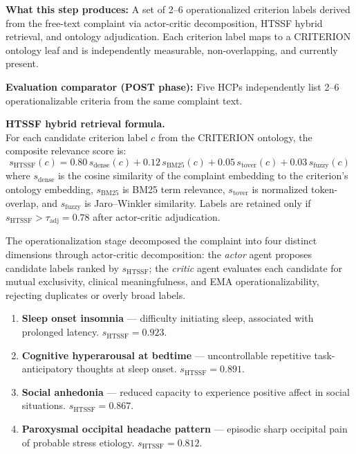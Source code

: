 \documentclass[11pt,a4paper]{article}
\begin{document}
\begin{tcolorbox}[
  colback=StepOneBG,colframe=PhoenixBlue,
  boxrule=0.6pt,arc=1.5mm,left=8pt,right=8pt
]
\small\textbf{What this step produces:} A set of 2--6 operationalized criterion labels derived from the free-text complaint via actor-critic decomposition, HTSSF hybrid retrieval, and ontology adjudication. Each criterion label maps to a CRITERION ontology leaf and is independently measurable, non-overlapping, and currently present.

\textbf{Evaluation comparator (POST phase):} Five HCPs independently list 2--6 operationalizable criteria from the same complaint text.
\end{tcolorbox}

\begin{tcolorbox}[colback=PhoenixSoft,colframe=PhoenixBlue!40,boxrule=0.5pt,arc=1.5mm,left=7pt,right=7pt,top=6pt,bottom=6pt]
\small\textbf{HTSSF hybrid retrieval formula.}\\[0.3em]
For each candidate criterion label $c$ from the CRITERION ontology, the composite relevance score is:
\[
  s_{\text{HTSSF}}(c) = 0.80\,s_{\text{dense}}(c)
                      + 0.12\,s_{\text{BM25}}(c)
                      + 0.05\,s_{\text{tover}}(c)
                      + 0.03\,s_{\text{fuzzy}}(c)
\]
where $s_{\text{dense}}$ is the cosine similarity of the complaint embedding to the criterion's ontology embedding, $s_{\text{BM25}}$ is BM25 term relevance, $s_{\text{tover}}$ is normalized token-overlap, and $s_{\text{fuzzy}}$ is Jaro–Winkler similarity. Labels are retained only if $s_{\text{HTSSF}} > \tau_{\text{adj}} = 0.78$ after actor-critic adjudication.
\end{tcolorbox}

\smallskip
The operationalization stage decomposed the complaint into four distinct dimensions through actor-critic decomposition: the \emph{actor} agent proposes candidate labels ranked by $s_{\text{HTSSF}}$; the \emph{critic} agent evaluates each candidate for mutual exclusivity, clinical meaningfulness, and EMA operationalizability, rejecting duplicates or overly broad labels.

\begin{enumerate}
\item \textbf{Sleep onset insomnia} --- difficulty initiating sleep, associated with prolonged latency. $s_{\text{HTSSF}} = 0.923$.
\item \textbf{Cognitive hyperarousal at bedtime} --- uncontrollable repetitive task-anticipatory thoughts at sleep onset. $s_{\text{HTSSF}} = 0.891$.
\item \textbf{Social anhedonia} --- reduced capacity to experience positive affect in social situations. $s_{\text{HTSSF}} = 0.867$.
\item \textbf{Paroxysmal occipital headache pattern} --- episodic sharp occipital pain of probable stress etiology. $s_{\text{HTSSF}} = 0.812$.
\end{enumerate}
\end{document}

